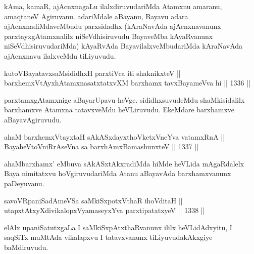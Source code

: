 \begin{artha}
kAma, kamaR, ajAcnxnagaLu ilalxdiruvudariMda Atamxnu amaranu, amaqtaneV Agiruvanu. adariMdale aBayanu, Bayavu adara ajAcnxnadiMdaveMbudu parxsidadhx (kAraNavAda ajAcnxnavanunx parxtayxgAtamxnalilx niSeVdhisiruvudu BayaveMba kAyaRvanunx niSeVdhisiruvudariMda) kAyaRvAda BayavilalxveMbudariMda kAraNavAda ajAcnxnavu ilalxveMdu tiLiyuvudu.
\end{artha}

\begin{shl}
kutoV\s BayatavxsaMsididhxH parxtiVca iti shaknikxteV || \\
barxhemxVtAyxhA\s \s tamxnasatxtatxvXM barxhamx tavxBayameVva hi ||  1336 ||  
\end{shl}

\begin{artha}
parxtamxgAtamxnige aBayarUpavu heVge. sididhxsuvudeMdu shaMkisidalilx barxhamxve Atamxna tatavxveMdu heVLiruvudu. EkeMdare barxhamxve aBayavAgiruvudu.
\end{artha}

\begin{shl}
ahaM barxhemxVtayxtaH sAkASxdayxthoVketxVneYva vatamxRnA  || \\
BayaheVtoVniRrAseVna sa barxhAmxBamashunxteV ||  1337 ||  
\end{shl}

\begin{artha}
ahaMbarxhamx' eMbuva sAkASxtAkxradiMda hiMde heVLida mAgaRdalelx Baya nimitatxvu hoVgiruvudariMda Atanu aBayavAda barxhamxvanunx paDeyuvanu.
\end{artha}


\begin{shl}
savoVRpaniSadAmeVSa saMkiSxpotxV\s thaR ihoVditaH || \\
utapxtAtxyXdivikalopxV\s yamaseyxYva parxtipatatxyeV ||  1338 ||  
\end{shl}

\begin{artha}
elAlx upaniSatutxgaLa I saMkiSxpAtxthaRvanunx ililx heVLidAdxyitu, I saqSiTx muMtAda vikalapxvu I tatavxvanunx tiLiyuvudakAkxgiye baMdiruvudu.
\end{artha}


